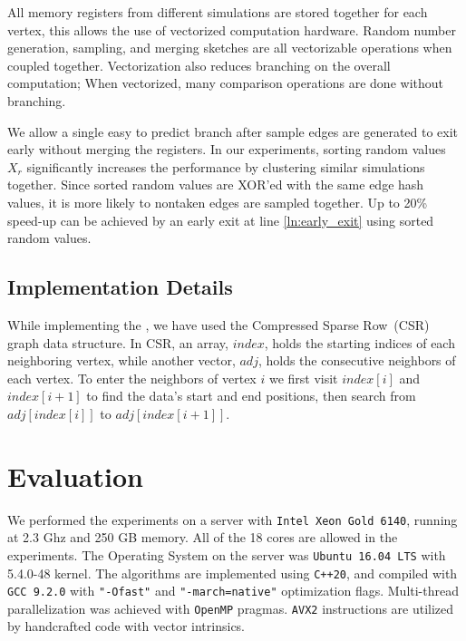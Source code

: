 \documentclass[10pt,journal,compsoc]{IEEEtran}
\newcommand\acro{{\sc{HyperFuseR\xspace}\xspace}\xspace}
\begin{document}
 All memory registers from different simulations are stored together for each vertex, this allows the use of vectorized computation hardware. Random number generation, sampling, and merging sketches are all vectorizable operations when coupled together. Vectorization also reduces branching on the overall computation; When vectorized, many comparison operations are done without branching. 

We allow a single easy to predict branch after sample edges are generated to exit early without merging the registers. In our experiments, sorting random values $X_r$ significantly increases the performance by clustering similar simulations together. Since sorted random values are XOR'ed with the same edge hash values, it is more likely to nontaken edges are sampled together. Up to 20\% speed-up can be achieved by an early exit at line \ref{ln:early_exit} using sorted random values.

\subsection{Implementation Details}
While implementing the \acro, we have used the Compressed Sparse Row~(CSR) graph data structure.
In CSR, an array, $index$, holds the starting indices of each neighboring vertex, while another vector, $adj$, holds the consecutive neighbors of each vertex. 
To enter the neighbors of vertex $i$ we first visit $index[i]$ and $index[i+1]$ 
to find the data's start and end positions, then search from $adj[index[i]]$ to $adj[index[i+1]]$. 
    
\section{Evaluation}\label{sec:evaluation}
We performed the experiments on a server with {\tt Intel Xeon Gold 6140}, running at 2.3 Ghz and 250 GB memory. All of the 18 cores are allowed in the experiments. The Operating System on the server was {\tt Ubuntu 16.04 LTS} with 5.4.0-48 kernel. The algorithms are implemented using {\tt C++20}, and compiled with {\tt GCC 9.2.0} with {\tt "-Ofast"} and {\tt "-march=native"} optimization flags. Multi-thread parallelization was achieved with {\tt OpenMP} pragmas. {\tt AVX2} instructions are utilized by handcrafted code with vector intrinsics.
\end{document}
